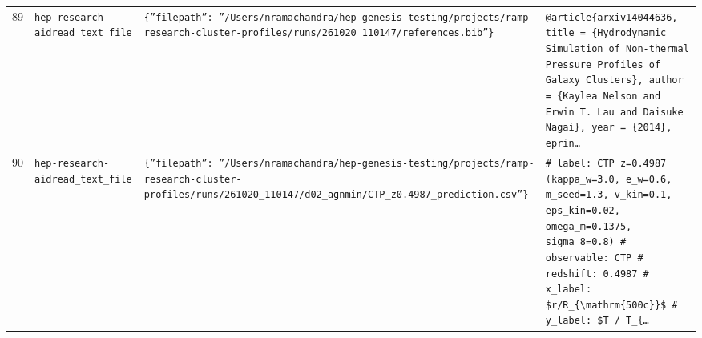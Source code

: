 \documentclass[11pt,a4paper]{article}
\begin{document}
\begin{longtable}{@{}p{}p{}p{}p{}@{}}
89 & \texttt{hep-research-aid}\newline\texttt{read\_\allowbreak{}text\_\allowbreak{}file} & \texttt{\{''filepath'':\allowbreak{} ''/\allowbreak{}Users/\allowbreak{}nramachandra/\allowbreak{}hep-genesis-testing/\allowbreak{}projects/\allowbreak{}ramp-research-cluster-profiles/\allowbreak{}runs/\allowbreak{}261020\_\allowbreak{}110147/\allowbreak{}references.bib''\}\allowbreak{}} & \texttt{@article\{arxiv14044636,\allowbreak{}   title =\allowbreak{} \{Hydrodynamic Simulation of Non-thermal Pressure Profiles of Galaxy Clusters\}\allowbreak{},\allowbreak{}   author =\allowbreak{} \{Kaylea Nelson and Erwin T. Lau and Daisuke Nagai\}\allowbreak{},\allowbreak{}   year =\allowbreak{} \{2014\}\allowbreak{},\allowbreak{}   eprin\ldots{}\allowbreak{}} \\
90 & \texttt{hep-research-aid}\newline\texttt{read\_\allowbreak{}text\_\allowbreak{}file} & \texttt{\{''filepath'':\allowbreak{} ''/\allowbreak{}Users/\allowbreak{}nramachandra/\allowbreak{}hep-genesis-testing/\allowbreak{}projects/\allowbreak{}ramp-research-cluster-profiles/\allowbreak{}runs/\allowbreak{}261020\_\allowbreak{}110147/\allowbreak{}d02\_\allowbreak{}agnmin/\allowbreak{}CTP\_\allowbreak{}z0.4987\_\allowbreak{}prediction.csv''\}\allowbreak{}} & \texttt{\# label:\allowbreak{} CTP z=\allowbreak{}0.4987 (kappa\_\allowbreak{}w=\allowbreak{}3.0,\allowbreak{} e\_\allowbreak{}w=\allowbreak{}0.6,\allowbreak{} m\_\allowbreak{}seed=\allowbreak{}1.3,\allowbreak{} v\_\allowbreak{}kin=\allowbreak{}0.1,\allowbreak{} eps\_\allowbreak{}kin=\allowbreak{}0.02,\allowbreak{} omega\_\allowbreak{}m=\allowbreak{}0.1375,\allowbreak{} sigma\_\allowbreak{}8=\allowbreak{}0.8)\allowbreak{} \# observable:\allowbreak{} CTP \# redshift:\allowbreak{} 0.4987 \# x\_\allowbreak{}label:\allowbreak{} \$r/\allowbreak{}R\_\allowbreak{}\{\textbackslash{}\allowbreak{}mathrm\{500c\}\allowbreak{}\}\allowbreak{}\$ \# y\_\allowbreak{}label:\allowbreak{} \$T /\allowbreak{} T\_\allowbreak{}\{\ldots{}\allowbreak{}} \\

\end{longtable}
\end{document}
